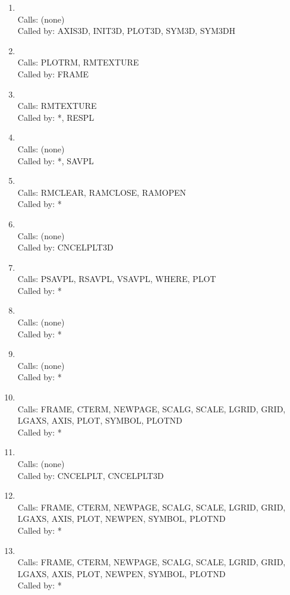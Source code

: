 \documentclass[11pt]{report}
\begin{document}
\begin{enumerate}
\item {}
\\ Calls:  (none)
\\ Called by: AXIS3D, INIT3D, PLOT3D, SYM3D, SYM3DH
\item {}
\\ Calls:  PLOTRM, RMTEXTURE
\\ Called by: FRAME
\item {}
\\ Calls:  RMTEXTURE
\\ Called by: *, RESPL
\item {}
\\ Calls:  (none)
\\ Called by: *, SAVPL
\item {}
\\ Calls:  RMCLEAR, RAMCLOSE, RAMOPEN
\\ Called by: *
\item {}
\\ Calls:  (none)
\\ Called by: CNCELPLT3D
\item {}
\\ Calls:  PSAVPL, RSAVPL, VSAVPL, WHERE, PLOT
\\ Called by: *
\item {}
\\ Calls:  (none)
\\ Called by: *
\item {}
\\ Calls:  (none)
\\ Called by: *
\item {}
\\ Calls:  FRAME, CTERM, NEWPAGE, SCALG, SCALE, LGRID, GRID, LGAXS,
AXIS, PLOT, SYMBOL, PLOTND
\\ Called by: *
\item {}
\\ Calls:  (none)
\\ Called by: CNCELPLT, CNCELPLT3D
\item {}
\\ Calls:  FRAME, CTERM, NEWPAGE, SCALG, SCALE, LGRID, GRID, LGAXS,
AXIS, PLOT, NEWPEN, SYMBOL, PLOTND
\\ Called by: *
\item {}
\\ Calls:  FRAME, CTERM, NEWPAGE, SCALG, SCALE, LGRID, GRID, LGAXS,
AXIS, PLOT, NEWPEN, SYMBOL, PLOTND
\\ Called by: *

\end{enumerate}
\end{document}
